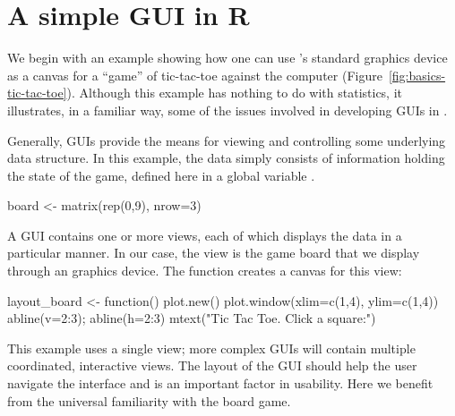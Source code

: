 





\section{A simple GUI in R}
\label{sec:GUI:tic-tac-toe}

We begin with an example showing how one can use \R's standard
graphics device as a canvas for a ``game'' of
tic-tac-toe against the computer (Figure~\ref{fig:basics-tic-tac-toe}). Although this example
has nothing to do with statistics, it illustrates, in a familiar way,
some of the issues involved in developing GUIs in \R. 



Generally, GUIs provide the means for viewing and controlling some
underlying data structure.  In this example, the data simply consists
of information holding the state of the game, defined here in a global
variable .

\begin{Schunk}
\begin{Sinput}
 board <- matrix(rep(0,9), nrow=3)      
\end{Sinput}
\end{Schunk}

A GUI contains one or more views, each of which displays the data in a
particular manner.  In our case, the view is the game board that we
display through an \R\/ graphics device. The 
function creates a canvas for this view:
\begin{Schunk}
\begin{Sinput}
 layout_board <- function() {
   plot.new()
   plot.window(xlim=c(1,4), ylim=c(1,4))
   abline(v=2:3);  abline(h=2:3)
   mtext("Tic Tac Toe. Click a square:")
 }
\end{Sinput}
\end{Schunk}
%
This example uses a single view; more complex GUIs
will contain multiple coordinated, interactive views. The layout of
the GUI should help the user navigate the interface and is an
important factor in usability. Here we benefit from the universal
familiarity with the board game.


